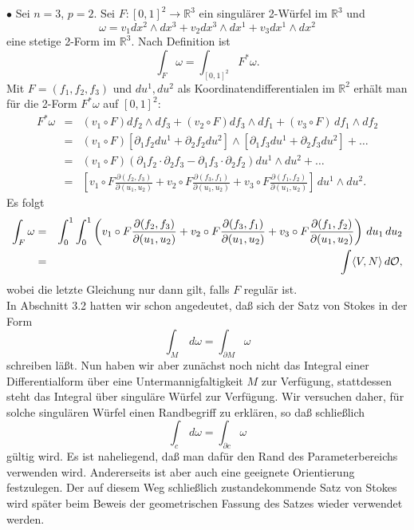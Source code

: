 \documentclass[a4paper,twoside,DIV15,BCOR12mm]{scrbook}
\begin{document}
\noindent $\bullet$ Sei $n = 3$, $p = 2$. Sei $F : [0,1]^{2} \to 
{\mathbb R}^{3}$ ein singulärer 2-Würfel im ${\mathbb R}^{3}$ und 
\[\omega = v_{1} dx^{2} \wedge dx^{3} + v_{2} dx^{3} \wedge dx^{1} + 
v_{3} dx^{1} \wedge dx^{2}\]
eine stetige 2-Form im ${\mathbb R}^{3}$. 
Nach Definition ist
\[ \int_{F} \omega = \int_{[0,1]^{2}} F^{*}\omega. \]
Mit $F = (f_{1},f_{2},f_{3})$ und $du^{1}, du^{2}$ als 
Koordinatendifferentialen im ${\mathbb R}^{2}$ erhält man für die 
2-Form $F^{*}\omega$ auf $[0,1]^{2}$:
\begin{eqnarray*}
F^{*}\omega & = & (v_{1} \circ F) df_{2} \wedge df_{3} + (v_{2} \circ 
F) df_{3} \wedge df_{1} + (v_{3} \circ F)\, df_{1} \wedge df_{2} \\
& = & (v_{1} \circ F)[\partial_{1} f_{2} du^{1} + \partial_{2} f_{2} 
du^{2}] \wedge [\partial_{1} f_{3} du^{1} + \partial_{2} f_{3} 
du^{2}] + \dots \\
& = & (v_{1} \circ F) (\partial_{1} f_{2} \cdot \partial_{2} f_{3} - 
\partial_{1} f_{3} \cdot \partial_{2}f_{2}) du^{1} \wedge du^{2} + 
\dots \\
& = & \left[ v_{1} \circ F 
\frac{\partial(f_{2},f_{3})}{\partial(u_{1},u_{2})} + v_{2} \circ F 
\frac{\partial(f_{3},f_{1})}{\partial(u_{1},u_{2})} + v_{3} \circ F 
\frac{\partial(f_{1},f_{2})}{\partial(u_{1},u_{2})} \right] \, 
du^{1} \wedge du^{2}.
\end{eqnarray*}
Es folgt
\begin{eqnarray*}
\int_{F} \omega & = & \int_{0}^{1} \int_{0}^{1} \left(v_{1} \circ F 
\frac{\partial(f_{2},f_{3})}{\partial(u_{1},u_{2})} + v_{2} \circ F 
\frac{\partial(f_{3},f_{1})}{\partial(u_{1},u_{2})} + v_{3} \circ F 
\frac{\partial(f_{1},f_{2})}{\partial(u_{1},u_{2})} \right) \, 
du_{1}\, du_{2} \\
& = & \int \langle V, N \rangle \, d{\cal O},
\end{eqnarray*}
wobei die letzte Gleichung nur dann gilt, falls $F$ regulär ist.\\



\noindent
In Abschnitt 3.2 hatten wir schon angedeutet, daß sich der Satz von 
Stokes in der Form
\[ \int_{M} \, d\omega = \int_{\partial M} \omega \]
schreiben läßt. Nun haben wir aber zunächst noch nicht das Integral 
einer Differentialform über eine Untermannigfaltigkeit $M$ zur 
Verfügung, stattdessen steht das Integral über singuläre Würfel zur Verfügung. 
Wir versuchen 
daher, für solche singulären Würfel einen Randbegriff zu 
erklären, so daß schließlich
\[ \int_{c}\, d\omega = \int_{\partial c} \omega \]
gültig wird. Es ist naheliegend, daß man dafür den Rand des 
Parameterbereichs verwenden wird. Andererseits ist aber auch eine 
geeignete Orientierung festzulegen. Der auf diesem Weg schließlich 
zustandekommende Satz von Stokes wird später beim Beweis der 
 geometrischen Fassung des Satzes wieder verwendet werden.
\end{document}
